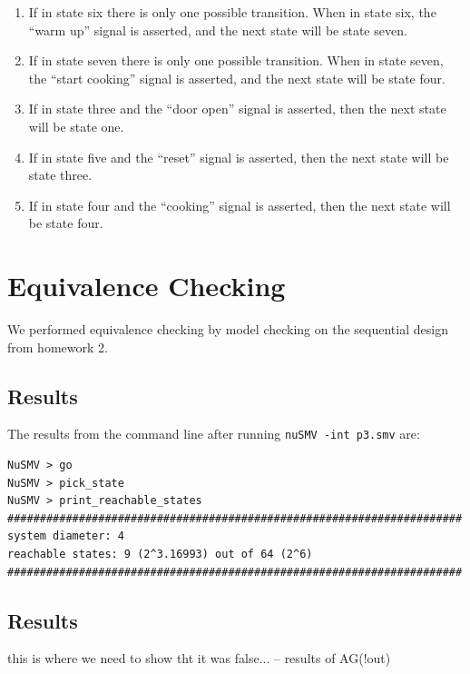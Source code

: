 \documentclass[11pt]{article}
\begin{document}
\begin{enumerate}
\item If in state six there is only one possible transition. When in state six, the “warm up” signal is asserted, and the next state will be state seven.
\item If in state seven there is only one possible transition. When in state seven, the “start cooking” signal is asserted, and the next state will be state four.
\item If in state three and the “door open” signal is asserted, then the next state will be state one.
\item If in state five and the “reset” signal is asserted, then the next state will be state three.
\item If in state four and the “cooking” signal is asserted, then the next state will be state four.
\end{enumerate}	



	
	

%

\section{Equivalence Checking} 
We performed equivalence checking by model checking on the sequential design from homework 2.
\subsection{Results}

The results from the command line after running \texttt{nuSMV -int p3.smv} are:
 \begin{lstlisting}[caption=NuSMV Interactive Output, label=p3_out]	
NuSMV > go
NuSMV > pick_state
NuSMV > print_reachable_states
######################################################################
system diameter: 4
reachable states: 9 (2^3.16993) out of 64 (2^6)
######################################################################
\end{lstlisting}


\subsection{Results}
this is where we need to show tht it was false... -- results of AG(!out)


%  
\end{document}
